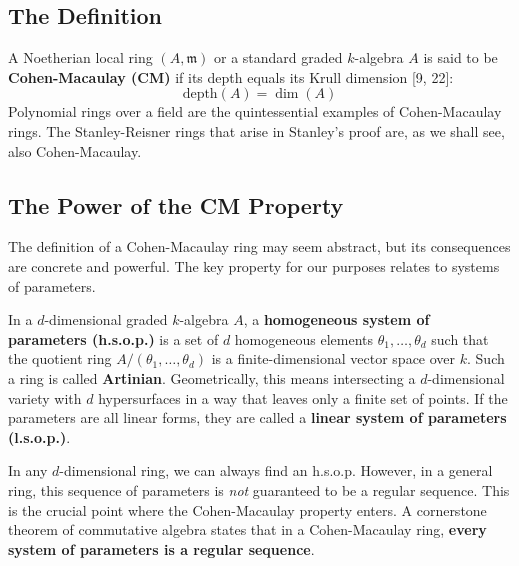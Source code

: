\documentclass[11pt]{article}
\begin{document}
\subsection{The Definition}

A Noetherian local ring $(A, \mathfrak{m})$ or a standard graded $k$-algebra $A$ is said to be \textbf{Cohen-Macaulay (CM)} if its depth equals its Krull dimension [9, 22]:
\[\text{depth}(A) = \dim(A)\]
Polynomial rings over a field are the quintessential examples of Cohen-Macaulay rings. The Stanley-Reisner rings that arise in Stanley's proof are, as we shall see, also Cohen-Macaulay.

\subsection{The Power of the CM Property}

The definition of a Cohen-Macaulay ring may seem abstract, but its consequences are concrete and powerful. The key property for our purposes relates to systems of parameters.

In a $d$-dimensional graded $k$-algebra $A$, a \textbf{homogeneous system of parameters (h.s.o.p.)} is a set of $d$ homogeneous elements $\theta_1, \ldots, \theta_d$ such that the quotient ring $A/(\theta_1, \ldots, \theta_d)$ is a finite-dimensional vector space over $k$. Such a ring is called \textbf{Artinian}. Geometrically, this means intersecting a $d$-dimensional variety with $d$ hypersurfaces in a way that leaves only a finite set of points. If the parameters are all linear forms, they are called a \textbf{linear system of parameters (l.s.o.p.)}.

In any $d$-dimensional ring, we can always find an h.s.o.p. However, in a general ring, this sequence of parameters is \textit{not} guaranteed to be a regular sequence. This is the crucial point where the Cohen-Macaulay property enters. A cornerstone theorem of commutative algebra states that in a Cohen-Macaulay ring, \textbf{every system of parameters is a regular sequence}.
\end{document}
